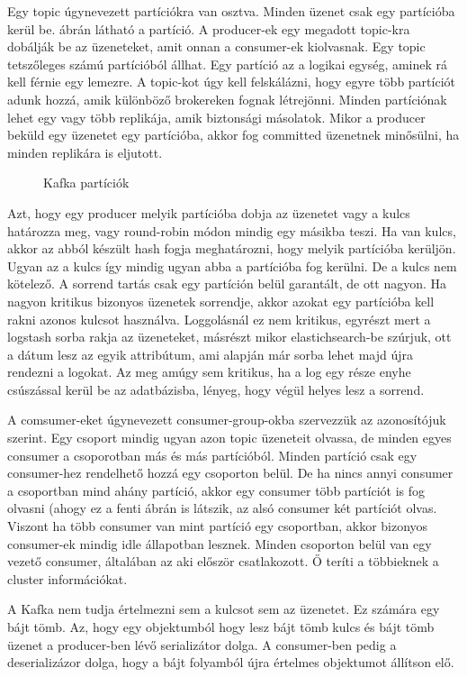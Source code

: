 Egy topic úgynevezett partíciókra van osztva. Minden üzenet csak egy partícióba kerül be.  ábrán látható a partíció.
A producer-ek egy megadott topic-kra dobálják be az üzeneteket, amit onnan a consumer-ek kiolvasnak. Egy topic tetszőleges számú partícióból állhat. Egy partíció az a logikai egység, aminek rá kell férnie egy lemezre. A topic-kot úgy kell felskálázni, hogy egyre több partíciót adunk hozzá, amik különböző brokereken fognak létrejönni. Minden partíciónak lehet egy vagy több replikája, amik biztonsági másolatok. Mikor a producer beküld egy üzenetet egy partícióba, akkor fog committed üzenetnek minősülni, ha minden replikára is eljutott.
\begin{figure}[ht]
	\centering
	\caption{Kafka partíciók} 
	\label{fig:kafka-partitions}
\end{figure}
Azt, hogy egy producer melyik partícióba dobja az üzenetet vagy a kulcs határozza meg, vagy round-robin módon mindig egy másikba teszi. Ha van kulcs, akkor az abból készült hash fogja meghatározni, hogy melyik partícióba kerüljön. Ugyan az a kulcs így mindig ugyan abba a partícióba fog kerülni. De a kulcs nem kötelező. A sorrend tartás csak egy partíción belül garantált, de ott nagyon. Ha nagyon kritikus bizonyos üzenetek sorrendje, akkor azokat egy partícióba kell rakni azonos kulcsot használva. Loggolásnál ez nem kritikus, egyrészt mert a logstash sorba rakja az üzeneteket, másrészt mikor elastichsearch-be szúrjuk, ott a dátum lesz az egyik attribútum, ami alapján már sorba lehet majd újra rendezni a logokat. Az meg amúgy sem kritikus, ha a log egy része enyhe csúszással kerül be az adatbázisba, lényeg, hogy végül helyes lesz a sorrend.

A comsumer-eket úgynevezett consumer-group-okba szervezzük az azonosítójuk szerint. Egy csoport mindig ugyan azon topic üzeneteit olvassa, de minden egyes consumer a csoporotban más és más partícióból. Minden partíció csak egy consumer-hez rendelhető hozzá egy csoporton belül. De ha nincs annyi consumer a csoportban mind ahány partíció, akkor egy consumer több partíciót is fog olvasni (ahogy ez a fenti ábrán is látszik, az alsó consumer két partíciót olvas. Viszont ha több consumer van mint partíció egy csoportban, akkor bizonyos consumer-ek mindig idle állapotban lesznek. Minden csoporton belül van egy vezető consumer, általában az aki először csatlakozott. Ő teríti a többieknek a cluster információkat.

A Kafka nem tudja értelmezni sem a kulcsot sem az üzenetet. Ez számára egy bájt tömb. Az, hogy egy objektumból hogy lesz bájt tömb kulcs és bájt tömb üzenet a producer-ben lévő serializátor dolga. A consumer-ben pedig a deserializázor dolga, hogy a bájt folyamból újra értelmes objektumot állítson elő.


